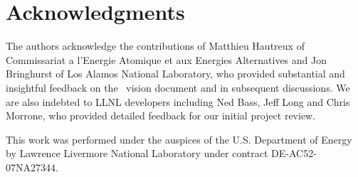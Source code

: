 \section {Acknowledgments}
The authors acknowledge the contributions of Matthieu Hautreux
of Commissariat a l'Energie Atomique et aux Energies Alternatives
and Jon Bringhurst of Los Alamos National Laboratory, who provided
substantial and insightful feedback on the \flux\ vision document
and in subsequent discussions.
We are also indebted to LLNL developers
including Ned Bass, Jeff Long and Chris Morrone,
who provided detailed feedback for our initial project review.

\ifcomments
{}
\fi

This work was performed under the auspices of the U.S. Department
of Energy by Lawrence Livermore National Laboratory under
contract DE-AC52-07NA27344.
